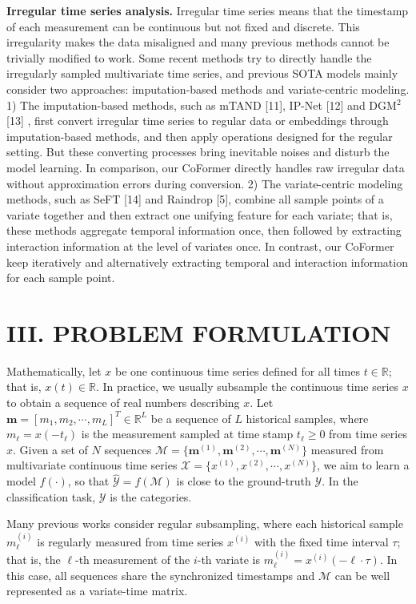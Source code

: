 \documentclass[twocolumn]{article}
\begin{document}
\textbf{Irregular time series analysis.} Irregular time series means that the timestamp of each measurement can be continuous but not fixed and discrete. This irregularity makes the data misaligned and many previous methods cannot be trivially modified to work. Some recent methods try to directly handle the irregularly sampled multivariate time series, and previous SOTA models mainly consider two approaches: imputation-based methods and variate-centric modeling. 1) The imputation-based methods, such as mTAND [11], IP-Net [12] and DGM$^2$ [13] , first convert irregular time series to regular data or embeddings through imputation-based methods, and then apply operations designed for the regular setting. But these converting processes bring inevitable noises and disturb the model learning. In comparison, our CoFormer directly handles raw irregular data without approximation errors during conversion. 2) The variate-centric modeling methods, such as SeFT [14] and Raindrop [5], combine all sample points of a variate together and then extract one unifying feature for each variate; that is, these methods aggregate temporal information once, then followed by extracting interaction information at the level of variates once. In contrast, our CoFormer keep iteratively and alternatively extracting temporal and interaction information for each sample point.

\section*{III. PROBLEM FORMULATION}

Mathematically, let $x$ be one continuous time series defined for all times $t \in \mathbb{R}$; that is, $x(t) \in \mathbb{R}$. In practice, we usually subsample the continuous time series $x$ to obtain a sequence of real numbers describing $x$. Let $\mathbf{m} = [m_1, m_2, \cdots, m_L]^T \in \mathbb{R}^L$ be a sequence of $L$ historical samples, where $m_\ell = x(-t_\ell)$ is the measurement sampled at time stamp $t_\ell \ge 0$ from time series $x$. Given a set of $N$ sequences $\mathcal{M} = \{\mathbf{m}^{(1)}, \mathbf{m}^{(2)}, \cdots, \mathbf{m}^{(N)}\}$ measured from multivariate continuous time series $\mathcal{X} = \{x^{(1)}, x^{(2)}, \cdots, x^{(N)}\}$, we aim to learn a model $f(\cdot)$, so that $\widehat{\mathcal{Y}} = f(\mathcal{M})$ is close to the ground-truth $\mathcal{Y}$. In the classification task, $\mathcal{Y}$ is the categories.

Many previous works consider regular subsampling, where each historical sample $m_\ell^{(i)}$ is regularly measured from time series $x^{(i)}$ with the fixed time interval $\tau$; that is, the $\ell$-th measurement of the $i$-th variate is $m_\ell^{(i)} = x^{(i)}(-\ell \cdot \tau)$. In this case, all sequences share the synchronized timestamps and $\mathcal{M}$ can be well represented as a variate-time matrix.
\end{document}
